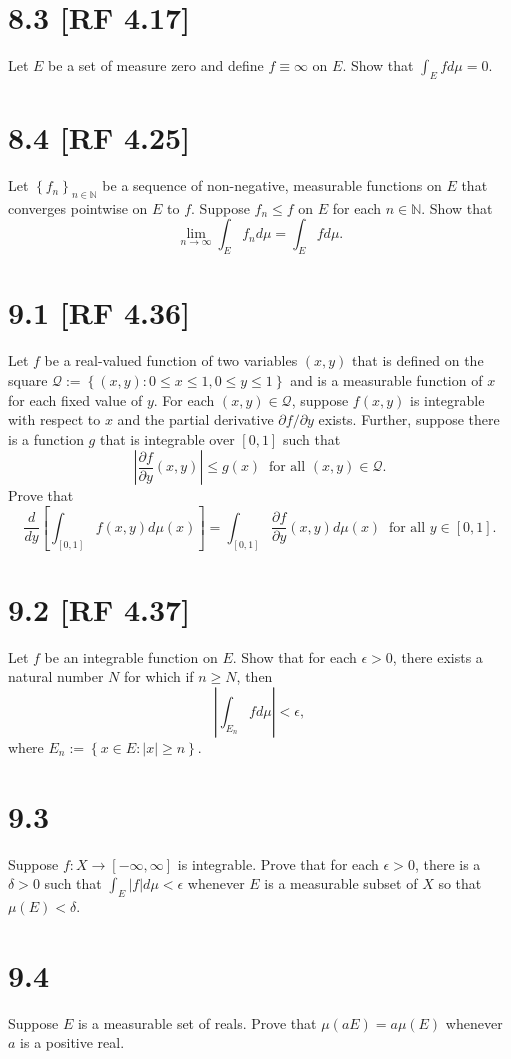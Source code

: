 \documentclass[12pt]{article}
\begin{document}
\section*{8.3 [RF 4.17]}
Let $E$ be a set of measure zero and define $f \equiv \infty$ on $E$. Show that $\int_{E}fd\mu = 0$.



\section*{8.4 [RF 4.25]}
Let $\left\{ f_{n} \right\}_{n\in\mathbb{N}}$ be a sequence of non-negative, measurable functions on $E$ that converges pointwise on $E$ to $f$.
Suppose $f_{n} \leq f$ on $E$ for each $n \in \mathbb{N}$. Show that 
\[ \lim_{n\rightarrow\infty}\int_{E}f_{n}d\mu = \int_{E}fd\mu. \]



\section*{9.1 [RF 4.36]}
Let $f$ be a real-valued function of two variables $(x,y)$ that is defined on the square $\mathcal{Q} := \left\{ (x,y) : 0 \leq x \leq 1, 0\leq y \leq
1 \right\}$ and is a measurable function of $x$ for each fixed value of $y$. For each $(x,y) \in \mathcal{Q}$, suppose $f(x,y)$ is 
integrable with respect to $x$ and the partial derivative $\partial f / \partial y$ exists. Further, suppose there is a function $g$ that is 
integrable over $[0,1]$ such that 
\[ \left| \frac{\partial f}{\partial y}(x,y)\right| \leq g(x) \ \text{ for all }(x,y) \in \mathcal{Q}. \]
Prove that 
\[ \frac{d}{dy}\left[ \int_{[0,1]}f(x,y)d\mu(x) \right] = \int_{[0,1]}\frac{\partial f}{\partial y}(x,y)d\mu(x) \ \text{ for all }y \in [0,1]. \]



\section*{9.2 [RF 4.37]}
Let $f$ be an integrable function on $E$. Show that for each $\epsilon > 0$, there exists a natural number $N$ for which if $n \geq N$, then 
\[ \left| \int_{E_{n}}fd\mu \right| < \epsilon, \]
where $E_{n} := \left\{ x \in E : |x| \geq n \right\}$.




\section*{9.3}
Suppose $f : X \rightarrow [-\infty, \infty]$ is integrable. Prove that for each $\epsilon > 0$, there is a $\delta > 0$ such that $\int_{E}|f|d\mu <
\epsilon$ whenever $E$ is a measurable subset of $X$ so that $\mu(E) < \delta$.




\section*{9.4}
Suppose $E$ is a measurable set of reals. Prove that $\mu(aE) = a \mu(E)$ whenever $a$ is a positive real.
\end{document}
